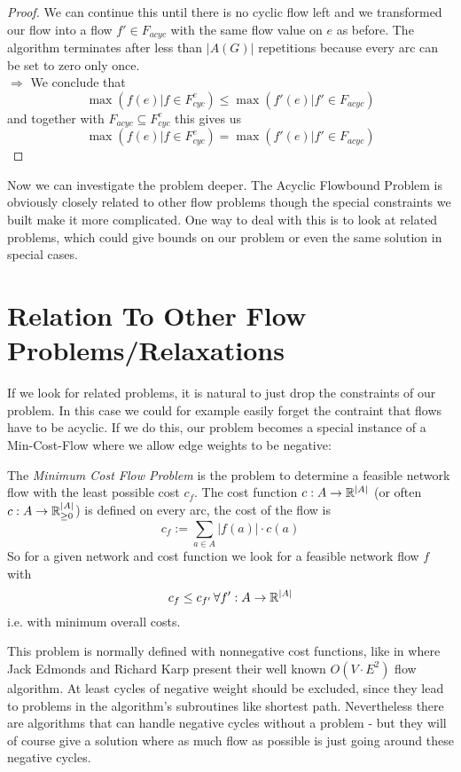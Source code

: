 \begin{proof}
We can continue this until there is no cyclic flow left and we transformed our flow into a flow $f'\in F_{acyc}$ with 
the same flow value on $e$ as before. The algorithm terminates after less than $|A(G)|$ repetitions because every arc 
can be set to zero only once.\\
$\Rightarrow $ We conclude that $$\max(f(e)|f\in F_{cyc}^e)\le \max(f'(e)|f'\in F_{acyc})$$ and together with 
$F_{acyc}\subseteq F_{cyc}^e $ this gives us
$$\max(f(e)|f\in F_{cyc}^e)= \max(f'(e)|f'\in F_{acyc}) $$
\end{proof}


Now we can investigate the problem deeper. The Acyclic Flowbound Problem is obviously closely related to other flow 
problems though the special constraints we built make it more complicated. One way to deal with this is to look at 
related problems, which could give bounds on our problem or even the same solution in special cases.

\section{Relation To Other Flow Problems/Relaxations}
\label{sect:mincostflow}
If we look for related problems, it is natural to just drop the constraints of our problem. In this case we could for 
example easily forget the contraint that flows have to be acyclic. If we do this, our problem becomes a special 
instance of a Min-Cost-Flow where we allow edge weights to be negative:

\begin{definition}\label{def:mincostflow}
 The \textit{Minimum Cost Flow Problem} is the problem to determine a feasible network flow with the least possible 
cost $c_f$. The cost function $c:A\to\mathbb{R}^{|A|}$ (or often $c:A\to\mathbb{R}^{|A|}_{\ge 0}$) is defined on every arc, the cost of 
the flow 
is $$c_f := \sum_{a\in A}|f(a)|\cdot c(a)$$ So for a given network and cost function we look for a feasible network 
flow $f$ with $$c_f\le c_{f'}\,\forall f':A\to\mathbb{R}^{|A|}$$ i.e. with minimum overall costs.
\end{definition}

This problem is normally defined with nonnegative cost functions, like in \cite{EdmondsKarp1972} where 
Jack Edmonds and Richard Karp present their well known $O(V\cdot E^2)$ flow algorithm. At least cycles of negative 
weight should be excluded, since they lead to problems in the algorithm's subroutines like shortest path. Nevertheless 
there are algorithms that can handle negative cycles without a problem - but they will of course give a solution 
where as much flow as possible is just going around these negative cycles. 


